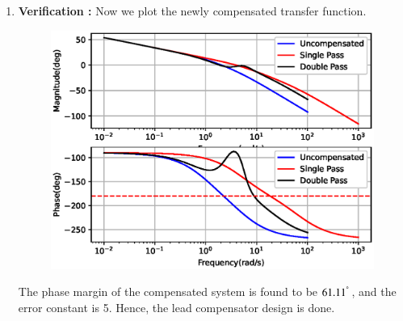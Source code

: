 \begin{enumerate}[label=\thesection.\arabic*.,ref=\thesection.\theenumi]
\item
\textbf{Verification : }
Now we plot the newly compensated transfer function.\\

\begin{figure}[!ht]
    \centering
    \includegraphics[width=\columnwidth]{./figs/ee18btech11051/ee18btech11051_fig3.eps}
    \label{fig:ee18btech11051_3}
\end{figure}

The phase margin of the compensated system is found to be $61.11^{\degree}$, and the error constant is 5. Hence, the lead compensator design is done. 

\end{enumerate}
